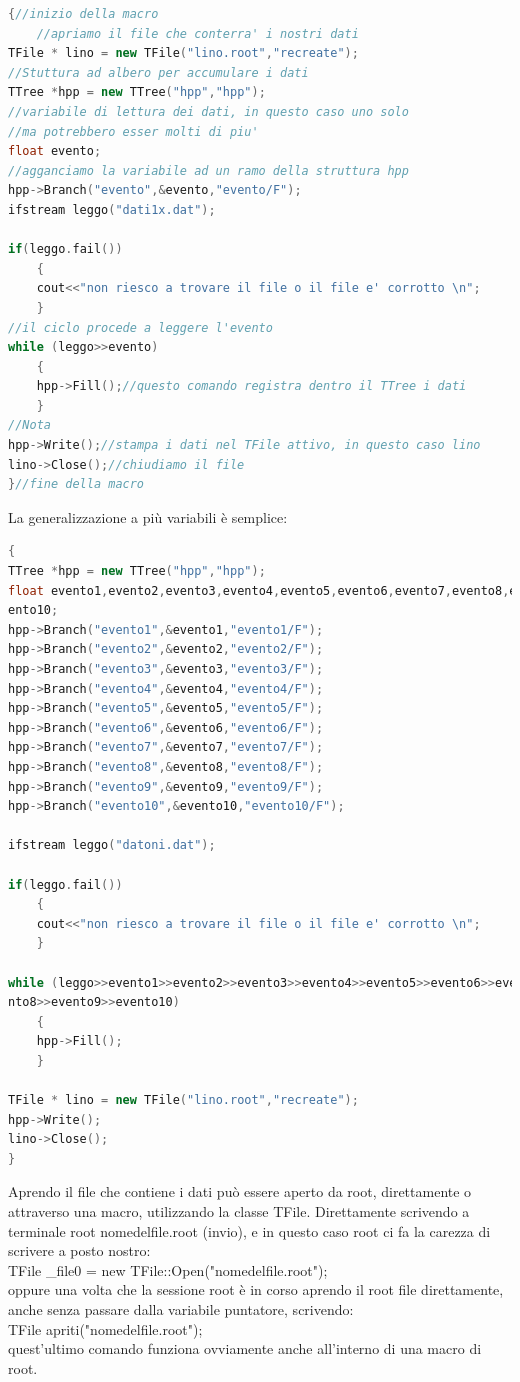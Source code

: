 \documentclass[11pt,fleqn]{book} %
\begin{document}
\begin{lstlisting}[language=c++]
{//inizio della macro
	//apriamo il file che conterra' i nostri dati
TFile * lino = new TFile("lino.root","recreate");
//Stuttura ad albero per accumulare i dati
TTree *hpp = new TTree("hpp","hpp");
//variabile di lettura dei dati, in questo caso uno solo 
//ma potrebbero esser molti di piu'
float evento;
//agganciamo la variabile ad un ramo della struttura hpp
hpp->Branch("evento",&evento,"evento/F");
ifstream leggo("dati1x.dat");

if(leggo.fail())
	{
	cout<<"non riesco a trovare il file o il file e' corrotto \n";
	}
//il ciclo procede a leggere l'evento
while (leggo>>evento)
	{
	hpp->Fill();//questo comando registra dentro il TTree i dati
	}
//Nota 
hpp->Write();//stampa i dati nel TFile attivo, in questo caso lino
lino->Close();//chiudiamo il file
}//fine della macro
\end{lstlisting}

La generalizzazione a più variabili è semplice:

\begin{lstlisting}[language=c++]
{
TTree *hpp = new TTree("hpp","hpp");
float evento1,evento2,evento3,evento4,evento5,evento6,evento7,evento8,evento9,ev
ento10;
hpp->Branch("evento1",&evento1,"evento1/F");
hpp->Branch("evento2",&evento2,"evento2/F");
hpp->Branch("evento3",&evento3,"evento3/F");
hpp->Branch("evento4",&evento4,"evento4/F");
hpp->Branch("evento5",&evento5,"evento5/F");
hpp->Branch("evento6",&evento6,"evento6/F");
hpp->Branch("evento7",&evento7,"evento7/F");
hpp->Branch("evento8",&evento8,"evento8/F");
hpp->Branch("evento9",&evento9,"evento9/F");
hpp->Branch("evento10",&evento10,"evento10/F");

ifstream leggo("datoni.dat");

if(leggo.fail())
	{
	cout<<"non riesco a trovare il file o il file e' corrotto \n";
	}

while (leggo>>evento1>>evento2>>evento3>>evento4>>evento5>>evento6>>evento7>>eve
nto8>>evento9>>evento10)
	{
	hpp->Fill();
	}

TFile * lino = new TFile("lino.root","recreate");
hpp->Write();
lino->Close();
}
\end{lstlisting}

Aprendo il file che contiene i dati può essere aperto da root, direttamente o attraverso una macro, utilizzando la classe TFile.
Direttamente scrivendo a terminale root nomedelfile.root (invio),
e in questo caso root ci fa la carezza di scrivere a posto nostro:\\
TFile \_file0 = new TFile::Open("nomedelfile.root");\\
oppure una volta che la sessione root è in corso aprendo il root file direttamente, anche senza passare dalla variabile puntatore, scrivendo:\\
TFile apriti("nomedelfile.root");\\
quest'ultimo comando funziona ovviamente anche all'interno di una macro di root.
\end{document}
